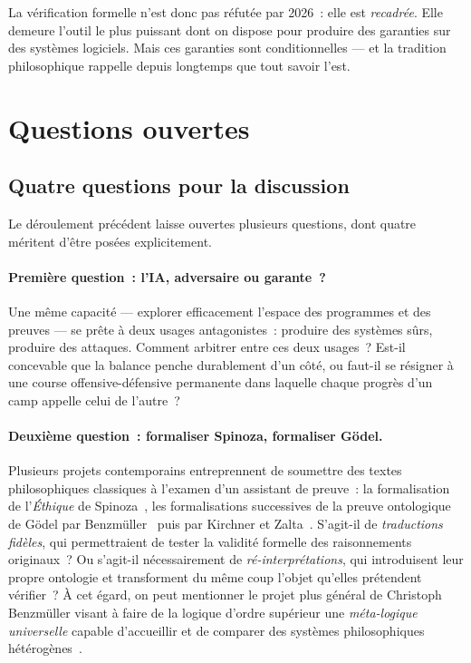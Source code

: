 \documentclass[11pt,a4paper]{article}
\begin{document}
La vérification formelle n'est donc pas réfutée par 2026~: elle est \emph{recadrée}. Elle demeure l'outil le plus puissant dont on dispose pour produire des garanties sur des systèmes logiciels. Mais ces garanties sont conditionnelles --- et la tradition philosophique rappelle depuis longtemps que tout savoir l'est.

\bigskip

\section{Questions ouvertes}

\subsection{Quatre questions pour la discussion}

Le déroulement précédent laisse ouvertes plusieurs questions, dont quatre méritent d'être posées explicitement.

\paragraph{Première question~: l'IA, adversaire ou garante~?} Une même capacité --- explorer efficacement l'espace des programmes et des preuves --- se prête à deux usages antagonistes~: produire des systèmes sûrs, produire des attaques. Comment arbitrer entre ces deux usages~? Est-il concevable que la balance penche durablement d'un côté, ou faut-il se résigner à une course offensive-défensive permanente dans laquelle chaque progrès d'un camp appelle celui de l'autre~?

\paragraph{Deuxième question~: formaliser Spinoza, formaliser Gödel.} Plusieurs projets contemporains entreprennent de soumettre des textes philosophiques classiques à l'examen d'un assistant de preuve~: la formalisation de l'\emph{Éthique} de Spinoza~\parencite{pommeret2025spinoza}, les formalisations successives de la preuve ontologique de Gödel par Benzmüller~\parencite{benzmuller2013goedel} puis par Kirchner et Zalta~\parencite{kirchner2017zalta}. S'agit-il de \emph{traductions fidèles}, qui permettraient de tester la validité formelle des raisonnements originaux~? Ou s'agit-il nécessairement de \emph{ré-interprétations}, qui introduisent leur propre ontologie et transforment du même coup l'objet qu'elles prétendent vérifier~? À cet égard, on peut mentionner le projet plus général de Christoph Benzmüller visant à faire de la logique d'ordre supérieur une \emph{méta-logique universelle} capable d'accueillir et de comparer des systèmes philosophiques hétérogènes~\parencite{benzmullerUniversalReasoningRational2017}.
\end{document}
